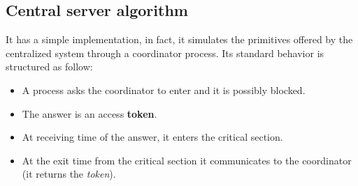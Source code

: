 \subsection{Central server algorithm}
It has a simple implementation, in fact, it simulates the primitives offered by the centralized system through a coordinator process. Its standard behavior is structured as follow:
\begin{itemize}
	\item A process asks the coordinator to enter and it is possibly blocked.
	\item The answer is an access \textbf{token}.
	\item At receiving time of the answer, it enters the critical section.
	\item At the exit time from the critical section it communicates to the coordinator (it returns the \textit{token}).
\end{itemize}

